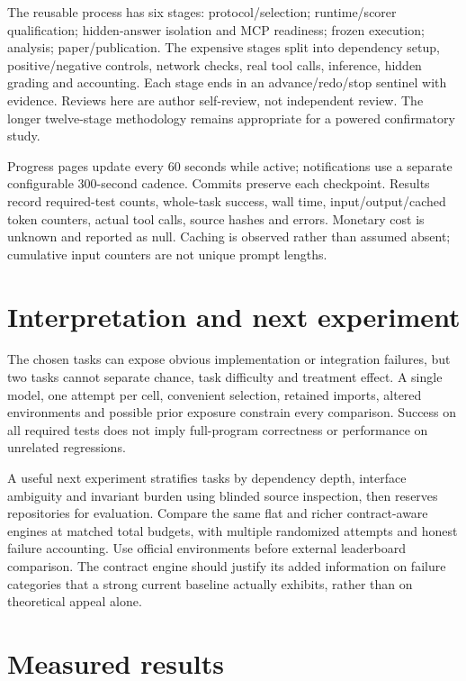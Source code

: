 \documentclass[11pt]{article}
\begin{document}
The reusable process has six stages: protocol/selection; runtime/scorer qualification; hidden-answer isolation and MCP readiness; frozen execution; analysis; paper/publication. The expensive stages split into dependency setup, positive/negative controls, network checks, real tool calls, inference, hidden grading and accounting. Each stage ends in an advance/redo/stop sentinel with evidence. Reviews here are author self-review, not independent review. The longer twelve-stage methodology remains appropriate for a powered confirmatory study\citep{oodmethod}.

Progress pages update every 60 seconds while active; notifications use a separate configurable 300-second cadence. Commits preserve each checkpoint. Results record required-test counts, whole-task success, wall time, input/output/cached token counters, actual tool calls, source hashes and errors. Monetary cost is unknown and reported as null. Caching is observed rather than assumed absent; cumulative input counters are not unique prompt lengths.

\section{Interpretation and next experiment}
The chosen tasks can expose obvious implementation or integration failures, but two tasks cannot separate chance, task difficulty and treatment effect. A single model, one attempt per cell, convenient selection, retained imports, altered environments and possible prior exposure constrain every comparison. Success on all required tests does not imply full-program correctness or performance on unrelated regressions.

A useful next experiment stratifies tasks by dependency depth, interface ambiguity and invariant burden using blinded source inspection, then reserves repositories for evaluation. Compare the same flat and richer contract-aware engines at matched total budgets, with multiple randomized attempts and honest failure accounting. Use official environments before external leaderboard comparison. The contract engine should justify its added information on failure categories that a strong current baseline actually exhibits, rather than on theoretical appeal alone.


\clearpage\section{Measured results}

\end{document}
